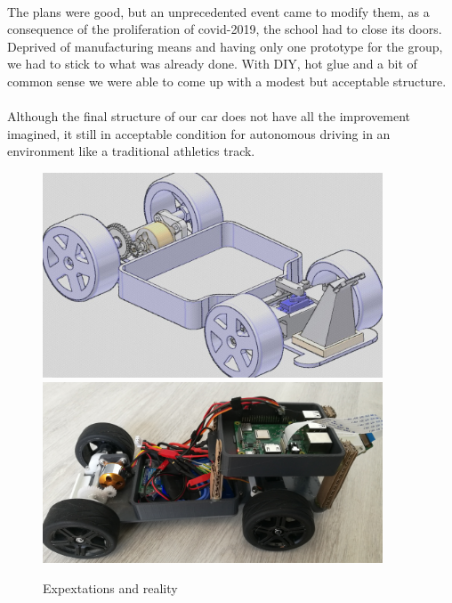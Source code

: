 \paragraph{}
The plans were good, but an unprecedented event came to modify them, as a
consequence of the proliferation of covid-2019, the school had to close its
doors. Deprived of manufacturing means and having only one prototype for the
group, we had to stick to what was already done. With DIY, hot glue and a
bit of common sense we were able to come up with a modest but acceptable
structure.

\paragraph{}
Although the final structure of our car does not have all the improvement
imagined, it still in acceptable condition for autonomous driving in an
environment like a traditional athletics track.

\begin{figure}[!ht]
    \begin{center}
        \includegraphics[width=0.9\textwidth]{Images/plan_global.png}
        \includegraphics[width=0.9\textwidth]{Images/Kart_overview_1.jpg}
    \end{center}
    \caption{Expextations and reality}
    \label{fig:expectation_reality}
\end{figure}

